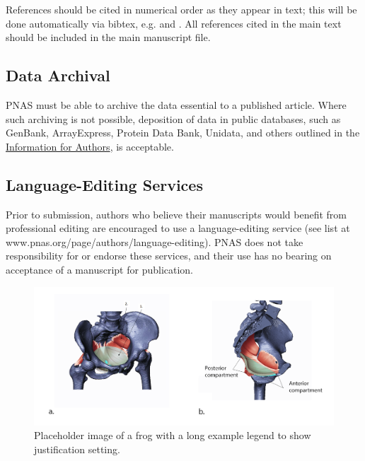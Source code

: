 \documentclass[9pt,twocolumn,twoside,lineno]{pnas-new}
\begin{document}
References should be cited in numerical order as they appear in text; this will be done automatically via bibtex, e.g. \cite{belkin2002using} and \cite{berard1994embedding,coifman2005geometric}. All references cited in the main text should be included in the main manuscript file.  

\subsection*{Data Archival}

PNAS must be able to archive the data essential to a published article. Where such archiving is not possible, deposition of data in public databases, such as GenBank, ArrayExpress, Protein Data Bank, Unidata, and others outlined in the \href{https://www.pnas.org/page/authors/journal-policies#xi}{Information for Authors}, is acceptable.

\subsection*{Language-Editing Services}
Prior to submission, authors who believe their manuscripts would benefit from professional editing are encouraged to use a language-editing service (see list at www.pnas.org/page/authors/language-editing). PNAS does not take responsibility for or endorse these services, and their use has no bearing on acceptance of a manuscript for publication. 

\begin{figure}%
\centering
\includegraphics[width=\linewidth]{figs/fig1}
\caption{Placeholder image of a frog with a long example legend to show justification setting.}
\label{fig:frog}
\end{figure}
\end{document}
